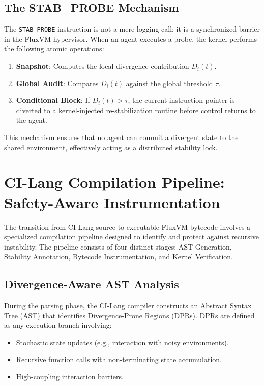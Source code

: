 \documentclass{article}
\begin{document}
\subsection{The STAB\_PROBE Mechanism}
The \texttt{STAB\_PROBE} instruction is not a mere logging call; it is a synchronized barrier in the FluxVM hypervisor. When an agent executes a probe, the kernel performs the following atomic operations:
\begin{enumerate}
    \item \textbf{Snapshot}: Computes the local divergence contribution $D_i(t)$.
    \item \textbf{Global Audit}: Compares $D_i(t)$ against the global threshold $\tau$.
    \item \textbf{Conditional Block}: If $D_i(t) > \tau$, the current instruction pointer is diverted to a kernel-injected re-stabilization routine before control returns to the agent.
\end{enumerate}

This mechanism ensures that no agent can commit a divergent state to the shared environment, effectively acting as a distributed stability lock.

\newpage

\section{CI-Lang Compilation Pipeline: Safety-Aware Instrumentation}
\label{sec:compiler_pipeline}

The transition from CI-Lang source to executable FluxVM bytecode involves a specialized compilation pipeline designed to identify and protect against recursive instability. The pipeline consists of four distinct stages: AST Generation, Stability Annotation, Bytecode Instrumentation, and Kernel Verification.

\subsection{Divergence-Aware AST Analysis}
During the parsing phase, the CI-Lang compiler constructs an Abstract Syntax Tree (AST) that identifies Divergence-Prone Regions (DPRs). DPRs are defined as any execution branch involving:
\begin{itemize}
    \item Stochastic state updates (e.g., interaction with noisy environments).
    \item Recursive function calls with non-terminating state accumulation.
    \item High-coupling interaction barriers.
\end{itemize}
\end{document}
